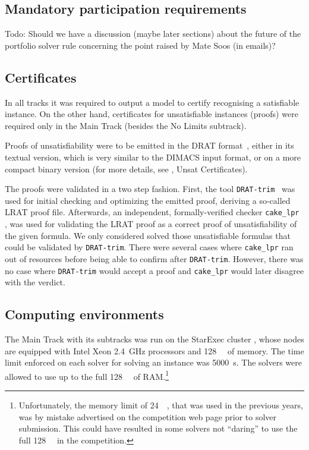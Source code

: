 \documentclass{elsarticle}
\newcommand{\todo}[1]{{\color{purple}Todo: #1}}
\begin{document}
\subsection{Mandatory participation requirements}



\todo{Should we have a discussion (maybe later sections)
about the future of the portfolio solver rule
concerning the point raised by Mate Soos (in emails)?}

\subsection{Certificates}

In all tracks it was required to output a model to certify recognising a satisfiable instance.
On the other hand, certificates for unsatisfiable instances (proofs) were required only 
in the Main Track (besides the No Limits subtrack).

Proofs of unsatisfiability were to be emitted in the DRAT format~\cite{DRATtrim},
either in its textual version, which is very similar to the DIMACS input format,
or on a more compact binary version (for more details, see \cite{satComp2020www}, Unsat Certificates).

The proofs were validated in a two step fashion. First, the tool {\tt DRAT-trim}~\cite{DRATtrim}
was used for initial checking and optimizing the emitted proof, deriving a so-called LRAT proof file.
Afterwards, an independent, formally-verified checker {\tt cake\_lpr} \cite{cakeLprGithub}, 
was used for validating the LRAT proof as a correct proof of unsatisfiability of the given formula.
We only considered solved those unsatisfiable formulas that could be validated by {\tt DRAT-trim}.
There were several cases where {\tt cake\_lpr} ran out of resources before being able to 
confirm after {\tt DRAT-trim}. However, there was no case where {\tt DRAT-trim} would accept
a proof and {\tt cake\_lpr} would later disagree with the verdict.

\subsection{Computing environments}

\label{sec:computing}
The Main Track with its subtracks was run on the StarExec cluster \cite{starexec},
whose nodes are equipped with Intel Xeon \SI{2.4}{\giga\hertz} processors 
and \SI{128}{\giga\byte} of memory.
The time limit enforced on each solver for solving an instance was \SI{5000}{\second}. 
The solvers were allowed to use up to the full \SI{128}{\giga\byte} of RAM.\footnote{
Unfortunately, the memory limit of \SI{24}{\giga\byte}, that was used in the previous years,
was by mistake advertised on the competition web page prior to solver submission.
This could have resulted in some solvers not ``daring'' to use the full \SI{128}{\giga\byte}
in the competition.}
\end{document}
